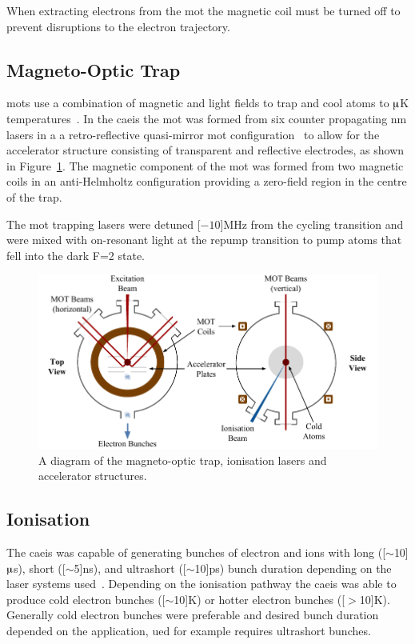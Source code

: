 When extracting electrons from the \gls{mot} the magnetic coil must be turned off to prevent disruptions to the electron trajectory.

\subsection{Magneto-Optic Trap}
\Glspl{mot} use a combination of magnetic and light fields to trap and cool atoms to $\muup$K temperatures~\cite{metcalf_laser_1999}.
In the \gls{caeis} the \gls{mot} was formed from six counter propagating \unit[780]{nm} lasers in a a retro-reflective quasi-mirror \gls{mot} configuration~\cite{hanssen_using_2006,mcculloch_generation_2013} to allow for the accelerator structure consisting of transparent and reflective electrodes, as shown in Figure~\ref{figure:mot}.
The magnetic component of the \gls{mot} was formed from two magnetic coils in an anti-Helmholtz configuration providing a zero-field region in the centre of the trap.

The \gls{mot} trapping lasers were detuned \unit[$-10$]{MHz} from the cycling transition and were mixed with on-resonant light at the repump transition to pump atoms that fell into the dark F=2 state.

\begin{figure}
    \center
    \includegraphics[width=145mm]{part2/Figs/MOTdiagram.pdf}
    \caption[A diagram of the magneto-optic trap.]{A diagram of the magneto-optic trap, ionisation lasers and accelerator structures.}
    \label{figure:mot}
\end{figure}

\subsection{Ionisation}\label{section:two_stage_ionisation}

The \gls{caeis} was capable of generating bunches of electron and ions with long (\unit[$\sim$10]{$\muup$s}), short (\unit[$\sim$5]{ns}), and ultrashort (\unit[$\sim$10]{ps}) bunch duration depending on the laser systems used~\cite{speirs_identification_2017,speirs_electron_2017}.
Depending on the ionisation pathway the \gls{caeis} was able to produce cold electron bunches (\unit[$\sim$10]{K}) or hotter electron bunches (\unit[$>$10]{K}).
Generally cold electron bunches were preferable and desired bunch duration depended on the application, \gls{ued} for example requires ultrashort bunches.

